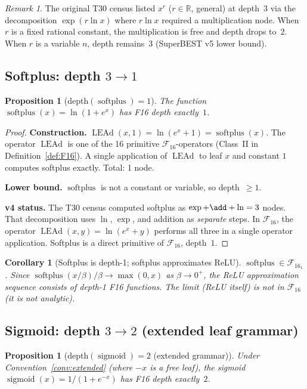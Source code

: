 \documentclass[12pt,a4paper]{article}
\newtheorem{corollary}[theorem]{Corollary}
\newtheorem{proposition}[theorem]{Proposition}
\theoremstyle{definition}
\theoremstyle{remark}
\newtheorem{remark}[theorem]{Remark}
\newcommand{\LEAd}{\operatorname{LEAd}}
\newcommand{\sigmoid}{\operatorname{sigmoid}}
\newcommand{\softplus}{\operatorname{softplus}}
\newcommand{\F}{\mathcal{F}_{16}}
\newcommand{\R}{\mathbb{R}}
\begin{document}
\begin{remark}
The original T30 census listed $x^r$ ($r\in\R$, general) at depth~$3$ via the
decomposition $\exp(r \ln x)$ where $r\ln x$ required a multiplication node.
When $r$ is a fixed rational constant, the multiplication is free and depth drops to~$2$.
When $r$ is a variable $n$, depth remains~$3$ (SuperBEST v5 lower bound).
\end{remark}

\subsection{Softplus: depth $3 \to 1$}

\begin{proposition}[depth$(\softplus) = 1$]
\label{prop:softplus}
The function $\softplus(x) = \ln(1 + e^x)$ has F16 depth exactly~$1$.
\end{proposition}

\begin{proof}
\textbf{Construction.}
$\LEAd(x, 1) = \ln(e^x + 1) = \softplus(x)$.
The operator $\LEAd$ is one of the 16 primitive $\F$-operators (Class~II in
Definition~\ref{def:F16}).  A single application of $\LEAd$ to leaf $x$ and
constant $1$ computes softplus exactly.  Total: 1 node.

\textbf{Lower bound.}
$\softplus$ is not a constant or variable, so depth~$\geq 1$.

\textbf{v4 status.}
The T30 census computed softplus as $\exp + \add + \ln = 3$ nodes.
That decomposition uses $\ln$, $\exp$, and addition as \emph{separate} steps.
In $\F$, the operator $\LEAd(x,y) = \ln(e^x + y)$ performs all three in a
single operator application.  Softplus is a direct primitive of $\F$, depth~$1$.
\end{proof}

\begin{corollary}[Softplus is depth-1; softplus approximates ReLU]
$\softplus \in \F_1$.  Since $\softplus(x/\beta)/\beta \to \max(0,x)$ as
$\beta \to 0^+$, the ReLU approximation sequence consists of depth-1 F16 functions.
The limit (ReLU itself) is not in $\F$ (it is not analytic).
\end{corollary}

\subsection{Sigmoid: depth $3 \to 2$ (extended leaf grammar)}

\begin{proposition}[depth$(\sigmoid) = 2$ (extended grammar)]
\label{prop:sigmoid}
Under Convention~\ref{conv:extended} (where $-x$ is a free leaf),
the sigmoid $\sigmoid(x) = 1/(1+e^{-x})$ has F16 depth exactly~$2$.
\end{proposition}
\end{document}

